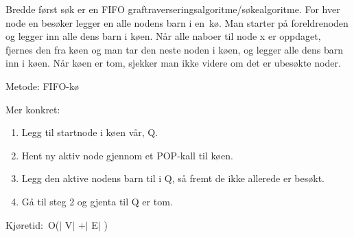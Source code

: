 \documentclass[12pt]{report}
\begin{document}

\setlength{\parskip}{0.0pt}
Bredde først søk er en FIFO graftraverseringsalgoritme/søkealgoritme. For hver node en besøker legger en alle nodens barn i en kø. Man starter på foreldrenoden og legger inn alle dens barn i køen. Når alle naboer til node x er oppdaget, fjernes den fra køen og man tar den neste noden i køen, og legger alle dens barn inn i køen. Når køen er tom, sjekker man ikke videre om det er ubesøkte noder. \par

Metode: FIFO-kø\par


\vspace{\baselineskip}
Mer konkret:\par

\begin{enumerate}[label*=\arabic*.]
	\item Legg til startnode i køen vår, Q.\par

	\item Hent ny aktiv node gjennom et POP-kall til køen.\par

	\item Legg den aktive nodens barn til i Q, så fremt de ikke allerede er besøkt.\par

	\item Gå til steg 2 og gjenta til Q er tom.
\end{enumerate}\par

Kjøretid: O($ \vert $ V$ \vert $ +$ \vert $ E$ \vert $ )\par


\vspace{\baselineskip}
\end{document}
